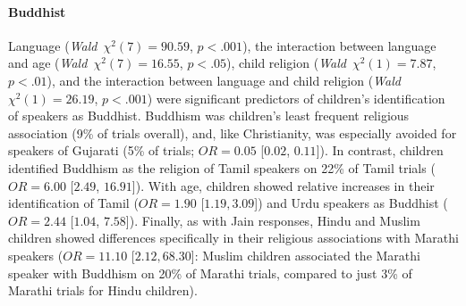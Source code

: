 \documentclass{foushee-adapted-preprint}
\begin{document}
\paragraph*{Buddhist} %
Language (\textit{Wald}~$\chi^2(7)=90.59$, $p<.001$), the interaction between language and age (\textit{Wald}~$\chi^2(7)=16.55$, $p<.05$), child religion (\textit{Wald}~$\chi^2(1)=7.87$, $p<.01$), and the interaction between language and child religion (\textit{Wald}~$\chi^2(1)=26.19$, $p<.001$) were significant predictors of children's identification of speakers as Buddhist. 
Buddhism was children's least frequent religious association (9\% of trials overall), and, like Christianity, was especially avoided for speakers of Gujarati (5\% of trials; $OR=0.05$ [$0.02$, $0.11$]). 
In contrast, children identified Buddhism as the religion of Tamil speakers on 22\% of Tamil trials ($OR=6.00$ [$2.49$, $16.91$]). 
With age, children showed relative increases in their identification of Tamil ($OR=1.90$ [$1.19, 3.09$]) and Urdu speakers as Buddhist ($OR= 2.44$ [$1.04$, $7.58$]). Finally, as with Jain responses, Hindu and Muslim children showed differences specifically in their religious associations with Marathi speakers ($OR=11.10$ [$2.12, 68.30$]: Muslim children associated the Marathi speaker with Buddhism on 20\% of Marathi trials, compared to just 3\% of Marathi trials for Hindu children). 
\end{document}
